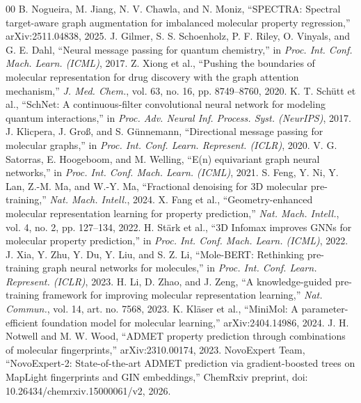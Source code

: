 \documentclass[conference]{IEEEtran}
\begin{document}
\begin{thebibliography}{00}
 B. Nogueira, M. Jiang, N. V. Chawla, and N. Moniz, ``SPECTRA: Spectral target-aware graph augmentation for imbalanced molecular property regression,'' arXiv:2511.04838, 2025.
 J. Gilmer, S. S. Schoenholz, P. F. Riley, O. Vinyals, and G. E. Dahl, ``Neural message passing for quantum chemistry,'' in \textit{Proc. Int. Conf. Mach. Learn. (ICML)}, 2017.
 Z. Xiong et al., ``Pushing the boundaries of molecular representation for drug discovery with the graph attention mechanism,'' \textit{J. Med. Chem.}, vol. 63, no. 16, pp. 8749--8760, 2020.
 K. T. Sch\"{u}tt et al., ``SchNet: A continuous-filter convolutional neural network for modeling quantum interactions,'' in \textit{Proc. Adv. Neural Inf. Process. Syst. (NeurIPS)}, 2017.
 J. Klicpera, J. Gro\ss{}, and S. G\"{u}nnemann, ``Directional message passing for molecular graphs,'' in \textit{Proc. Int. Conf. Learn. Represent. (ICLR)}, 2020.
 V. G. Satorras, E. Hoogeboom, and M. Welling, ``E(n) equivariant graph neural networks,'' in \textit{Proc. Int. Conf. Mach. Learn. (ICML)}, 2021.
 S. Feng, Y. Ni, Y. Lan, Z.-M. Ma, and W.-Y. Ma, ``Fractional denoising for 3D molecular pre-training,'' \textit{Nat. Mach. Intell.}, 2024.
 X. Fang et al., ``Geometry-enhanced molecular representation learning for property prediction,'' \textit{Nat. Mach. Intell.}, vol. 4, no. 2, pp. 127--134, 2022.
 H. St\"{a}rk et al., ``3D Infomax improves GNNs for molecular property prediction,'' in \textit{Proc. Int. Conf. Mach. Learn. (ICML)}, 2022.
 J. Xia, Y. Zhu, Y. Du, Y. Liu, and S. Z. Li, ``Mole-BERT: Rethinking pre-training graph neural networks for molecules,'' in \textit{Proc. Int. Conf. Learn. Represent. (ICLR)}, 2023.
 H. Li, D. Zhao, and J. Zeng, ``A knowledge-guided pre-training framework for improving molecular representation learning,'' \textit{Nat. Commun.}, vol. 14, art. no. 7568, 2023.
 K. Kl\"{a}ser et al., ``MiniMol: A parameter-efficient foundation model for molecular learning,'' arXiv:2404.14986, 2024.
 J. H. Notwell and M. W. Wood, ``ADMET property prediction through combinations of molecular fingerprints,'' arXiv:2310.00174, 2023.
 NovoExpert Team, ``NovoExpert-2: State-of-the-art ADMET prediction via gradient-boosted trees on MapLight fingerprints and GIN embeddings,'' ChemRxiv preprint, doi: 10.26434/chemrxiv.15000061/v2, 2026.

\end{thebibliography}
\end{document}
